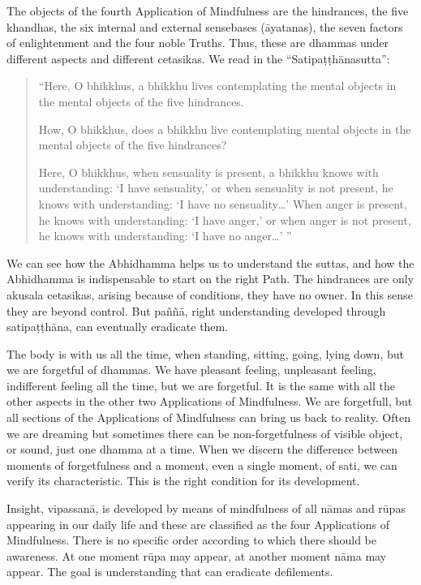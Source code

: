 The objects of the fourth Application of Mindfulness are the hindrances, the five khandhas, the six internal and external sensebases (āyatanas), the seven factors of enlightenment and the four noble Truths. Thus, these are dhammas under different aspects and different cetasikas. We read in the ``Satipaṭṭhānasutta'':

\begin{quote}
``Here, O bhikkhus, a bhikkhu lives contemplating the mental objects in the mental objects of the five hindrances.

How, O bhikkhus, does a bhikkhu live contemplating mental objects in the mental objects of the five hindrances?

Here, O bhikkhus, when sensuality is present, a bhikkhu knows with
understanding: `I have sensuality,' or when sensuality is not
present, he knows with understanding: `I have no sensuality\ldots '
When anger is present, he knows with understanding: `I have anger,' or when anger is not present, he knows with understanding: `I have no anger\ldots' ''
\end{quote}

We can see how the Abhidhamma helps us to understand the suttas, and how the Abhidhamma is indispensable to start on the right Path. The hindrances are only akusala cetasikas, arising because of conditions, they have no owner. In this sense they are beyond control. But paññā, right understanding developed through satipaṭṭhāna, can eventually eradicate them.

The body is with us all the time, when standing, sitting, going, lying down, but we are forgetful of dhammas. We have pleasant feeling, unpleasant feeling, indifferent feeling all the time, but we are forgetful. It is the same with all the other aspects in the other two Applications of Mindfulness. We are forgetfull, but all sections of the Applications of Mindfulness can bring us back to reality. Often we are dreaming but sometimes there can be non-forgetfulness of visible object, or sound, just one dhamma at a time. When we discern the difference between moments of forgetfulness and a moment, even a single moment, of sati, we can verify its characteristic. This is the right condition for its development.

Insight, vipassanā, is developed by means of mindfulness of all nāmas and rūpas appearing in our daily life and these are classified as the four Applications of Mindfulness. There is no specific order according to which there should be awareness. At one moment rūpa may appear, at another moment nāma may appear. The goal is understanding that can eradicate defilements.

